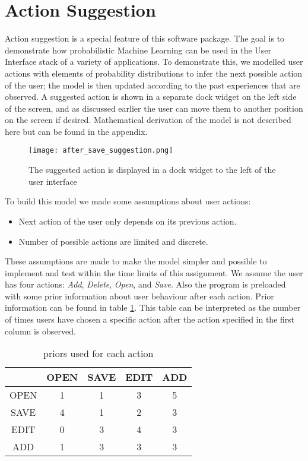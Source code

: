 \section{Action Suggestion}
Action suggestion is a special feature of this software package. The goal is to demonstrate how probabilistic Machine Learning can be used in the User Interface stack of a variety of applications. To demonstrate this, we modelled user actions with elements of probability distributions to infer the next possible action of the user; the model is then updated according to the past experiences that are observed. A suggested action is shown in a separate dock widget on the left side of the screen, and as discussed earlier the user can move them to another position on the screen if desired. Mathematical derivation of the model is not described here but can be found in the appendix.

\begin{figure}[h]
\centering
\texttt{[image: after\_save\_suggestion.png]}
\caption{The suggested action is displayed in a dock widget to the left of the user interface}
\label{fig:fullView}
\end{figure}

To build this model we made some assumptions about user actions:
\begin{itemize}
\item Next action of the user only depends on its previous action.
\item Number of possible actions are limited and discrete.
\end{itemize}
These assumptions are made to make the model simpler and possible to implement and test within the time limits of this assignment. We assume the user has four actions: {\textit{Add}, \textit{Delete}, \textit{Open}, and \textit{Save}}. Also the program is preloaded with some prior information about user behaviour after each action. Prior information can be found in table \ref{tab:priors}. This table can be interpreted as the number of times users have chosen a specific action after the action specified in the first column is observed.
\begin{table}[h]
\centering
\begin{tabular}{|c|c|c|c|c|}
\hline \rule[-1ex]{0pt}{3.5ex}  & OPEN & SAVE & EDIT & ADD \\ 
\hline \rule[-1ex]{0pt}{3.5ex} OPEN & 1 & 1 & 3 & 5 \\ 
\hline \rule[-1ex]{0pt}{3.5ex} SAVE & 4 & 1 & 2 & 3 \\ 
\hline \rule[-1ex]{0pt}{3.5ex} EDIT & 0 & 3 & 4 & 3 \\ 
\hline \rule[-1ex]{0pt}{3.5ex} ADD & 1 & 3 & 3 & 3 \\ 
\hline 
\end{tabular}
\caption{priors used for each action}
\label{tab:priors}
\end{table}

